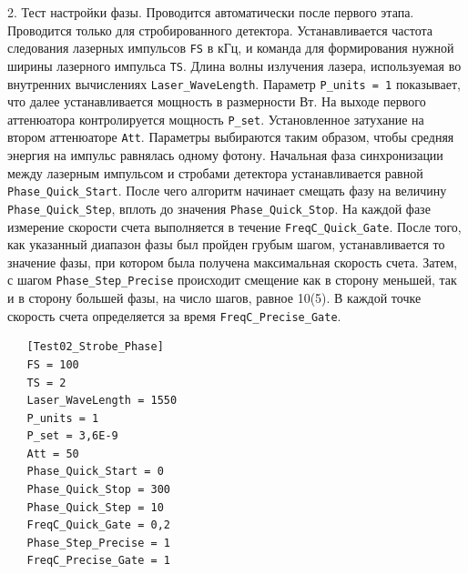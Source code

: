 \documentclass[12pt]{article}
\begin{document}
2. Тест настройки фазы. Проводится автоматически после первого этапа. Проводится только для стробированного детектора. Устанавливается частота следования лазерных импульсов \verb|FS| в кГц, и команда для формирования нужной ширины лазерного импульса \verb|TS|. Длина волны излучения лазера, используемая во внутренних вычислениях \verb|Laser_WaveLength|. Параметр \verb|P_units = 1| показывает, что далее устанавливается мощность в размерности Вт. На выходе первого аттенюатора контролируется мощность \verb|P_set|. Установленное затухание на втором аттенюаторе \verb|Att|. Параметры выбираются таким образом, чтобы средняя энергия на импульс равнялась одному фотону. Начальная фаза синхронизации между лазерным импульсом и стробами детектора устанавливается равной \verb|Phase_Quick_Start|. После чего алгоритм начинает смещать фазу на величину \verb|Phase_Quick_Step|, вплоть до значения \verb|Phase_Quick_Stop|. На каждой фазе измерение скорости счета выполняется в течение \verb|FreqC_Quick_Gate|. После того, как указанный диапазон фазы был пройден грубым шагом, устанавливается то значение фазы, при котором была получена максимальная скорость счета. Затем, с шагом \verb|Phase_Step_Precise| происходит смещение как в сторону меньшей, так и в сторону большей фазы, на число шагов, равное 10(5). В каждой точке скорость счета определяется за время \verb|FreqC_Precise_Gate|. 


\begin{lstlisting}
   [Test02_Strobe_Phase]
   FS = 100
   TS = 2
   Laser_WaveLength = 1550
   P_units = 1
   P_set = 3,6E-9
   Att = 50
   Phase_Quick_Start = 0
   Phase_Quick_Stop = 300
   Phase_Quick_Step = 10
   FreqC_Quick_Gate = 0,2
   Phase_Step_Precise = 1
   FreqC_Precise_Gate = 1
\end{lstlisting}
\end{document}
